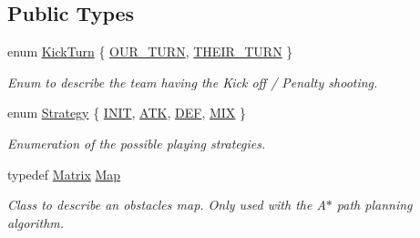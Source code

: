 \subsection*{Public Types}
\begin{DoxyCompactItemize}
\item 
enum \hyperlink{classInterpreter_ac7c3ba77d973ffbb84b12db662cfe643}{KickTurn} \{ \hyperlink{classInterpreter_ac7c3ba77d973ffbb84b12db662cfe643a8c18a3c8b220a0c8166c1ee4b3504ebe}{OUR\_\-TURN}, 
\hyperlink{classInterpreter_ac7c3ba77d973ffbb84b12db662cfe643ac196847925fbe4bc38ee72b9b97d0f76}{THEIR\_\-TURN}
 \}
\begin{DoxyCompactList}\small\item\em Enum to describe the team having the Kick off / Penalty shooting. \item\end{DoxyCompactList}\item 
enum \hyperlink{classInterpreter_a0fb49436c8c14ca79e13f1cd78119088}{Strategy} \{ \hyperlink{classInterpreter_a0fb49436c8c14ca79e13f1cd78119088af1c3928f408be0d85ce73e1686e519d9}{INIT}, 
\hyperlink{classInterpreter_a0fb49436c8c14ca79e13f1cd78119088a8bf993c8b673e31f609171552d65c4c4}{ATK}, 
\hyperlink{classInterpreter_a0fb49436c8c14ca79e13f1cd78119088ae58df17fd988314c295b980f6a5a6a75}{DEF}, 
\hyperlink{classInterpreter_a0fb49436c8c14ca79e13f1cd78119088a5509091a7f3746995da83c92dd449187}{MIX}
 \}
\begin{DoxyCompactList}\small\item\em Enumeration of the possible playing strategies. \item\end{DoxyCompactList}\item 
typedef \hyperlink{classMatrix}{Matrix} \hyperlink{classInterpreter_a4c080f069f557cf92dfe803117a6ea53}{Map}
\begin{DoxyCompactList}\small\item\em Class to describe an obstacles map. Only used with the A$\ast$ path planning algorithm. \item\end{DoxyCompactList}\end{DoxyCompactItemize}
